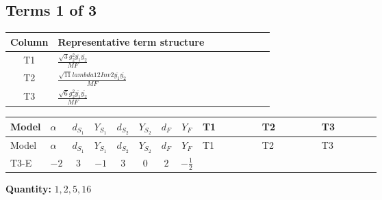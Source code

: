 \documentclass[8pt]{article}
\begin{document}
\begin{landscape}
\subsection*{Terms 1 of 3}
\begin{center}
\begin{tabular}{@{}c >{\raggedright\arraybackslash}p{0.82\linewidth}@{}}
\toprule
Column & Representative term structure \\
\midrule
T1 & \(\displaystyle \frac{\sqrt{3} g_{2}^{2} \overline{y_{1}} \overline{y_{2}}}{MF}\) \\
\midrule
T2 & \(\displaystyle \frac{\sqrt{11} lambda12Inv2 \overline{y_{1}} \overline{y_{2}}}{MF}\) \\
\midrule
T3 & \(\displaystyle \frac{\sqrt{6} g_{2}^{2} \overline{y_{1}} \overline{y_{2}}}{MF}\) \\
\midrule
\bottomrule
\end{tabular}
\end{center}
\smallskip
\tiny
\begin{longtable}{@{}llcccccc >{\raggedright\arraybackslash}p{0.21\linewidth} >{\raggedright\arraybackslash}p{0.21\linewidth} >{\raggedright\arraybackslash}p{0.21\linewidth}@{}}
\toprule
Model & $\alpha$ & $d_{S_1}$ & $Y_{S_1}$ & $d_{S_2}$ & $Y_{S_2}$ & $d_F$ & $Y_F$ & T1 & T2 & T3 \\
\midrule
\endfirsthead
\toprule
Model & $\alpha$ & $d_{S_1}$ & $Y_{S_1}$ & $d_{S_2}$ & $Y_{S_2}$ & $d_F$ & $Y_F$ & T1 & T2 & T3 \\
\midrule
\endhead
T3-E & $-2$ & $3$ & $-1$ & $3$ & $0$ & $2$ & $-\frac{1}{2}$ & \scriptsize\adjustbox{max width=\linewidth}{$\begin{gathered} - \frac{15 \sqrt{3} g_{2}^{2} \overline{y_{1}} \overline{y_{2}}}{8 MF}\end{gathered}$} & \scriptsize\adjustbox{max width=\linewidth}{$\begin{gathered} - \frac{3 \sqrt{11} lambda12Inv2 \overline{y_{1}} \overline{y_{2}}}{22 MF}\end{gathered}$} & \scriptsize\adjustbox{max width=\linewidth}{$\begin{gathered} - \frac{\sqrt{6} g_{2}^{2} \overline{y_{1}} \overline{y_{2}}}{6 MF}\end{gathered}$} \\
\midrule
\bottomrule
\end{longtable}
\clearpage
\noindent\textbf{Quantity: }$\mathrm{1,2,5,16}$\par\smallskip

\end{landscape}
\end{document}
